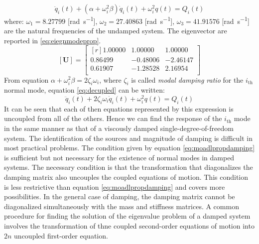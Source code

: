 \begin{equation}\label{eq:decupled}
  \ddot{q}_{i}(t) + (\alpha + \omega_{i}^2\beta)\dot{q}_{i}(t) +
  \omega_{i}^{2}q(t) = Q_{i}(t)
\end{equation}
where: \(\omega_{1} = 8.27799\) [\si{\radian\per\second}],
\(\omega_{2} = 27.40863\) [\si{\radian\per\second}],
\(\omega_{3} = 41.91576\) [\si{\radian\per\second}] are
the natural frequencies of the undamped system.
The eigenvector are reported in \eqref{eq:eiegnmodeprop}.
\begin{equation}\label{eq:eiegnmodeprop}
	[\mathbf{U}] = \begin{bmatrix*}[r]
		1.00000 & 1.00000 & 1.00000 \\
		0.86499 &-0.48006 &-2.46147 \\
		0.61907 &-1.28528 & 2.16954 \\
 	\end{bmatrix*}
\end{equation}
From equation \(\alpha + \omega^{2}_{i}\beta = 2\zeta_{i}\omega_{i}\), where
\(\zeta_{i}\) is called \emph{modal damping ratio} for the \(i_\text{th}\)
normal mode, equation \eqref{eq:decupled} can be written:
\begin{equation}\label{eq:decupled2}
  \ddot{q}_{i}(t) + 2\zeta_{i}\omega_{i}\dot{q}_{i}(t) +
  \omega_{i}^{2}q(t) = Q_{i}(t)
\end{equation}
It can be seen that each of then equations represented by this expression is
uncoupled from all of the others.
Hence we can find the response of the \(i_\text{th}\) mode in the same manner
as that of a viscously damped single-degree-of-freedom system.
%
%
%
%
%
The identification of the sources and magnitude of damping is difficult in most
practical problems.
The condition given by equation \eqref{eq:moadlpropdamping} is sufficient but not
necessary for the existence of normal modes in damped systems.
The necessary condition is that the transformation that diagonalizes the damping
matrix also uncouples the coupled equations of motion.
This condition is less restrictive than equation \eqref{eq:moadlpropdamping}
and covers more possibilities.
In the general case of damping, the damping matrix cannot be diagonalized
simultaneously with the mass and stiffness matrices.
A common procedure for finding the solution of the eigenvalue problem of a
damped system involves the transformation of thne coupled second-order
equations of motion into \(2n\) uncoupled first-order equation.
%


